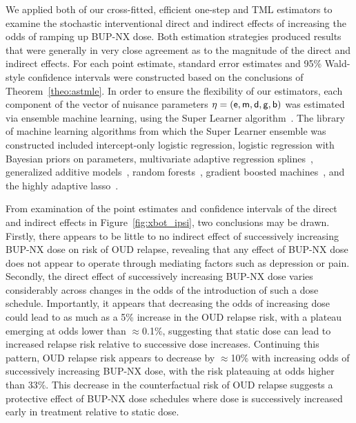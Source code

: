 We applied both of our cross-fitted, efficient one-step and TML estimators to
examine the stochastic interventional direct and indirect effects of increasing
the odds of ramping up BUP-NX dose. Both estimation strategies produced results
that were generally in very close agreement as to the magnitude of the direct
and indirect effects. For each point estimate, standard error estimates and 95\%
Wald-style confidence intervals were constructed based on the conclusions of
Theorem~\ref{theo:astmle}. In order to ensure the flexibility of our estimators,
each component of the vector of nuisance parameters $\eta = (\mathsf{e}, \mathsf{m}, \mathsf{d}, \mathsf{g},
\mathsf{b})$ was estimated via ensemble machine learning, using the Super Learner
algorithm~\citep{vdl2007super, coyle2020sl3}. The library of machine learning
algorithms from which the Super Learner ensemble was constructed included
intercept-only logistic regression, logistic regression with Bayesian priors on
parameters, multivariate adaptive regression
splines~\citep{friedman1991multivariate}, generalized additive
models~\citep{hastie1990generalized}, random forests~\citep{breiman2001random},
gradient boosted machines~\citep{friedman2001greedy}, and the highly adaptive
lasso~\citep{benkeser2016highly, coyle2020hal9001, hejazi2020hal9001}.

From examination of the point estimates and confidence intervals of the direct
and indirect effects in Figure~\ref{fig:xbot_ipsi}, two conclusions may be
drawn. Firstly, there appears to be little to no indirect effect of successively
increasing BUP-NX dose on risk of OUD relapse, revealing that any effect of
BUP-NX dose does not appear to operate through mediating factors such as
depression or pain. Secondly, the direct effect of successively increasing
BUP-NX dose varies considerably across changes in the odds of the introduction
of such a dose schedule. Importantly, it appears that decreasing the odds of
increasing  dose could lead to as much as a 5\% increase in the OUD relapse
risk, with a plateau emerging at odds lower than $\approx$0.1\%, suggesting that
static dose can lead to increased relapse risk relative to successive dose
increases. Continuing this pattern, OUD relapse risk appears to decrease by
$\approx$10\% with increasing odds of successively increasing BUP-NX dose, with
the risk plateauing at odds higher than 33\%. This decrease in the
counterfactual risk of OUD relapse suggests a protective effect of BUP-NX dose
schedules where dose is successively increased early in treatment relative to
static dose.

